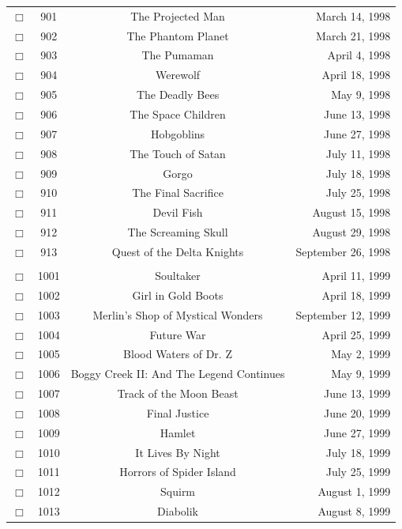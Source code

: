 \documentclass[12pt]{article}
\begin{document}
\begin{center}
\begin{longtable}[c]{cccr}
\\  %
$\Box$&901&The Projected Man&March 14, 1998\\
$\Box$&902&The Phantom Planet&March 21, 1998\\
$\Box$&903&The Pumaman&April  4, 1998\\
$\Box$&904&Werewolf&April 18, 1998\\
$\Box$&905&The Deadly Bees&May  9, 1998\\
$\Box$&906&The Space Children&June 13, 1998\\
$\Box$&907&Hobgoblins&June 27, 1998\\
$\Box$&908&The Touch of Satan&July 11, 1998\\
$\Box$&909&Gorgo&July 18, 1998\\
$\Box$&910&The Final Sacrifice&July 25, 1998\\
$\Box$&911&Devil Fish&August 15, 1998\\
$\Box$&912&The Screaming Skull&August 29, 1998\\
$\Box$&913&Quest of the Delta Knights&September 26, 1998\\  %

\\  %
$\Box$&1001&Soultaker&April 11, 1999\\
$\Box$&1002&Girl in Gold Boots&April 18, 1999\\
$\Box$&1003&Merlin's Shop of Mystical Wonders&September 12, 1999\\
$\Box$&1004&Future War&April 25, 1999\\
$\Box$&1005&Blood Waters of Dr. Z&May  2, 1999\\
$\Box$&1006&Boggy Creek II: And The Legend Continues&May  9, 1999\\
$\Box$&1007&Track of the Moon Beast&June 13, 1999\\
$\Box$&1008&Final Justice&June 20, 1999\\
$\Box$&1009&Hamlet&June 27, 1999\\
$\Box$&1010&It Lives By Night&July 18, 1999\\
$\Box$&1011&Horrors of Spider Island&July 25, 1999\\
$\Box$&1012&Squirm&August  1, 1999\\
$\Box$&1013&Diabolik&August  8, 1999\\  %


\end{longtable}
\end{center}
\end{document}
